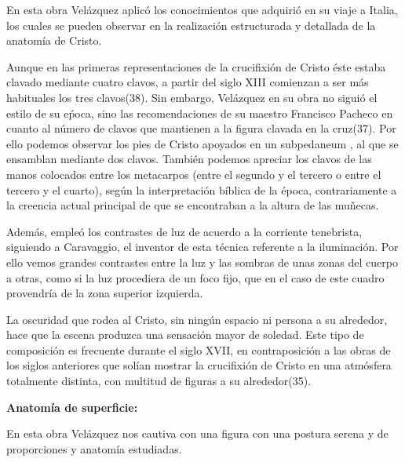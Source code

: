 En esta obra Velázquez aplicó los conocimientos que adquirió en su viaje a Italia, los cuales se pueden observar en la realización estructurada y detallada de la anatomía de Cristo.

Aunque en las primeras representaciones de la crucifixión de Cristo éste estaba clavado mediante cuatro clavos, a partir del siglo XIII comienzan a ser más habituales los tres clavos(38). Sin embargo, Velázquez en su obra no siguió el estilo de su eṕoca, sino las recomendaciones de su maestro Francisco Pacheco en cuanto al número de clavos que mantienen a la figura clavada en la cruz(37). Por ello podemos observar los pies de Cristo apoyados en un subpedaneum%
, al que se ensamblan mediante dos clavos. También podemos apreciar los clavos de las manos colocados entre los metacarpos (entre el segundo y el tercero o entre el tercero y el cuarto), según la interpretación bíblica de la época, contrariamente a la creencia actual principal de que se encontraban a la altura de las muñecas.

Además, empleó los contrastes de luz de acuerdo a la corriente tenebrista, siguiendo a Caravaggio, el inventor de esta técnica referente a la iluminación. Por ello vemos grandes contrastes entre la luz y las sombras de unas zonas del cuerpo a otras, como si la luz procediera de un foco fijo, que en el caso de este cuadro provendría de la zona superior izquierda.

La oscuridad que rodea al Cristo, sin ningún espacio ni persona a su alrededor, hace que la escena produzca una sensación mayor de soledad. Este tipo de composición es frecuente durante el siglo XVII, en contraposición a las obras de los siglos anteriores que solían mostrar la crucifixión de Cristo en una atmósfera totalmente distinta, con multitud de figuras a su alrededor(35).

\vspace{12pt}
\textbf{Anatomía de superficie:}

En esta obra Velázquez nos cautiva con una figura con una postura serena y de proporciones y anatomía estudiadas. %

